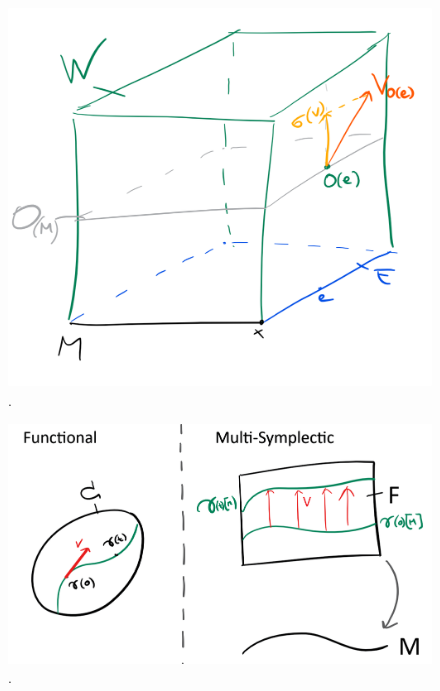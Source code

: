 \documentclass[12pt]{article}
\begin{document}
\begin{figure}
  \centering
  \includegraphics{Pictures/sigma.png}
  \caption{.}
\end{figure}

\begin{figure}
  \centering
  \includegraphics{Pictures/variations.png}
  \caption{.}
\end{figure}

%
%
\end{document}
